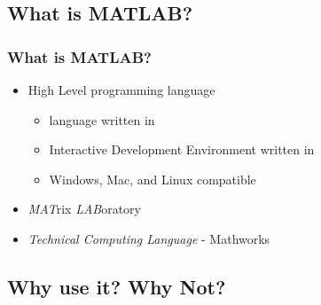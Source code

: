 \documentclass[fleqn]{beamer} %
\newcommand{\sectionIIsubsectionItitle}{What is MATLAB?}
\newcommand{\sectionIIsubsectionIItitle}{Why use it? Why Not?}
\begin{document}
		\subsection{\sectionIIsubsectionItitle}\label{sectionIIsubsectionI}

			\begin{frame}[label=sectionIIsubsectionI]
				\frametitle{\sectionIIsubsectionItitle}
				\bigskip

				\begin{itemize}
					\item High Level programming language
					\begin{itemize}
						\item language written in \underline{\hspace{40mm}}
						\item Interactive Development Environment written in \underline{\hspace{40mm}} 
						\item Windows, Mac, and Linux compatible
					\end{itemize}
					\item {\it MAT}rix {\it LAB}oratory
					\item {\it Technical Computing Language} - Mathworks
				\end{itemize}	

				\btVFill
			\end{frame}

		\subsection{\sectionIIsubsectionIItitle}\label{sectionIIsubsectionII}
\end{document}
